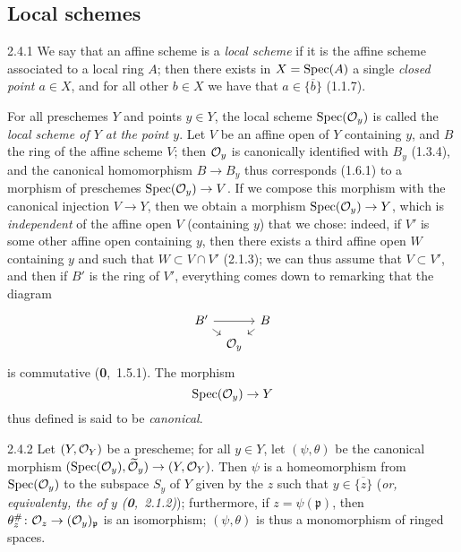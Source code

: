 \documentclass[../main.tex]{subfiles}
\begin{document}
\subsection{Local schemes}

\begin{cx}{2.4.1}
    We say that an affine scheme is a \emph{local scheme} if it is the affine scheme associated to a local ring $A$; then there exists in $X=\operatorname*{Spec}(A)$ a single \emph{closed point $a\in X$}, and for all other $b\in X$ we have that $a\in\overline{\{b\}}$ (1.1.7).
\end{cx}

For all preschemes $Y$ and points $y\in Y$, the local scheme $\operatorname*{Spec}(\mathcal{O}_y)$ is called the \emph{local scheme of $Y$ at the point $y$}.
Let $V$ be an affine open of $Y$ containing $y$, and $B$ the ring of the affine scheme $V$; then $\mathcal{O}_y$ is canonically identified with $B_y$ (1.3.4), and the canonical homomorphism $B\to B_y$ thus corresponds (1.6.1) to a morphism of preschemes $\operatorname*{Spec}(\mathcal{O}_y)\to V$.
If we compose this morphism with the canonical injection $V\to Y$, then we obtain a morphism $\operatorname*{Spec}(\mathcal{O}_y)\to Y$, which is \emph{independent} of the affine open $V$ (containing $y$) that we chose: indeed, if $V'$ is some other affine open containing $y$, then there exists a third affine open $W$ containing $y$ and such that $W\subset V\cap V'$ (2.1.3); we can thus assume that $V\subset V'$, and then if $B'$ is the ring of $V'$, everything comes down to remarking that the diagram
\begin{equation*}
    \begin{tikzcd}[column sep=tiny, row sep=tiny]
        B'\arrow[rr]\arrow[dr]&&B\arrow[dl]\\
        &\O_y&
    \end{tikzcd}
\end{equation*}
is commutative (\textbf{0},~1.5.1).
The morphism
\begin{equation*}
    \operatorname*{Spec}(\mathcal{O}_y)\to Y
\end{equation*}
thus defined is said to be \emph{canonical}.

\begin{cx}[Proposition]{2.4.2}
    Let $(Y,\mathcal{O}_Y)$ be a prescheme; for all $y\in Y$, let $(\psi,\theta)$ be the canonical morphism $(\operatorname*{Spec}(\mathcal{O}_y),\widetilde{\mathcal{O}}_y)\to(Y,\mathcal{O}_Y)$.
    Then $\psi$ is a homeomorphism from $\operatorname*{Spec}(\mathcal{O}_y)$ to the subspace $S_y$ of $Y$ given by the $z$ such that $y\in\overline{\{z\}}$ (\emph{or, equivalenty, the \emph{} of $y$ (\textbf{0},~2.1.2)}); furthermore, if $z=\psi(\mathfrak{p})$, then $\theta_z^\#\colon\mathcal{O}_z\to(\mathcal{O}_y)_\mathfrak{p}$ is an isomorphism; $(\psi,\theta)$ is thus a monomorphism of ringed spaces.
\end{cx}
\end{document}
